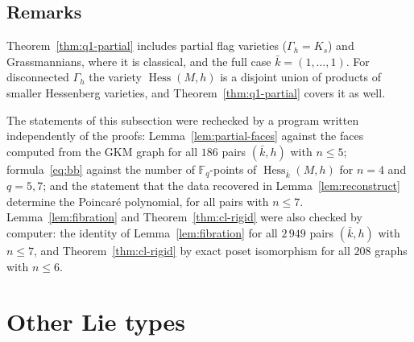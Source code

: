 \documentclass[11pt,a4paper]{article}
\numberwithin{equation}{section}
\theoremstyle{plain}
\theoremstyle{definition}
\theoremstyle{remark}
\DeclareMathOperator{\Hess}{Hess}
\begin{document}
\subsection{Remarks}
Theorem~\ref{thm:q1-partial} includes partial flag varieties ($\Gamma_h=K_s$) and Grassmannians, where it is classical, and the full case $\bar k=(1,\dots,1)$. For disconnected $\Gamma_h$ the variety $\Hess(M,h)$ is a disjoint union of products of smaller Hessenberg varieties, and Theorem~\ref{thm:q1-partial} covers it as well.

The statements of this subsection were rechecked by a program written independently of the proofs: Lemma~\ref{lem:partial-faces} against the faces computed from the GKM graph for all $186$ pairs $(\bar k,h)$ with $n\leqslant5$; formula~\eqref{eq:bb} against the number of $\mathbb F_q$-points of $\Hess_{\bar k}(M,h)$ for $n=4$ and $q=5,7$; and the statement that the data recovered in Lemma~\ref{lem:reconstruct} determine the Poincaré polynomial, for all pairs with $n\leqslant7$. Lemma~\ref{lem:fibration} and Theorem~\ref{thm:cl-rigid} were also checked by computer: the identity of Lemma~\ref{lem:fibration} for all $2\,949$ pairs $(\bar k,h)$ with $n\leqslant7$, and Theorem~\ref{thm:cl-rigid} by exact poset isomorphism for all $208$ graphs with $n\leqslant6$.

\section{Other Lie types}\label{sec:lie}
\end{document}
